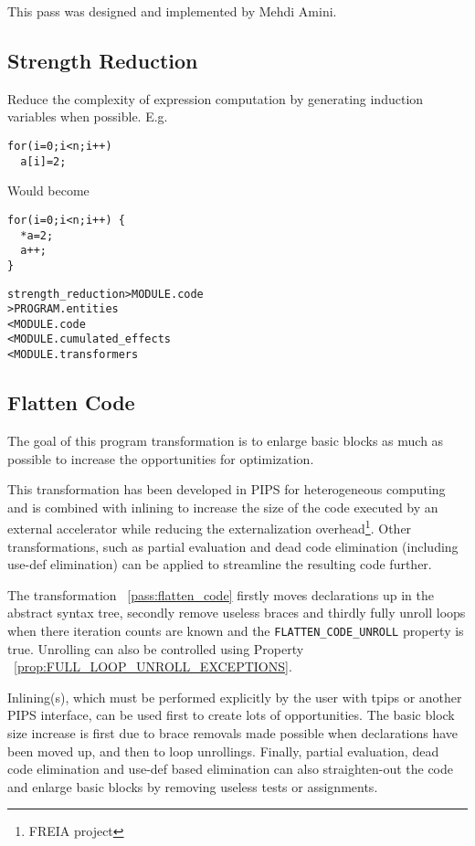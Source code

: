 \documentclass[a4paper]{report}
\newenvironment{PipsMake}{\begin{alltt}}{\end{alltt}}
\newcommand{\PipsPropRef}[1]{\texttt{\detokenize{#1}}~\ref{prop:#1}}
\newcommand{\PipsPassRef}[1]{\texttt{\detokenize{#1}}~\ref{pass:#1}}
\newenvironment{PipsPass}[1]{\label{pass:#1}}{}
\begin{document}
This pass was designed and implemented by Mehdi Amini.

\subsection{Strength Reduction}

\begin{PipsPass}{strength_reduction}
Reduce the complexity of expression computation by generating
induction variables when possible.
\end{PipsPass}
E.g.
\begin{lstlisting}
for(i=0;i<n;i++)
  a[i]=2;
\end{lstlisting}
Would become
\begin{lstlisting}
for(i=0;i<n;i++) {
  *a=2;
  a++;
}
\end{lstlisting}
\begin{PipsMake}
strength_reduction > MODULE.code
                   > PROGRAM.entities
    < MODULE.code
    < MODULE.cumulated_effects
    < MODULE.transformers
\end{PipsMake}


\subsection{Flatten Code}

\begin{PipsPass}{flatten_code}
The goal of this program transformation is to enlarge basic blocks as
much as possible to increase the opportunities for optimization.
\end{PipsPass}

This transformation has been developed in PIPS for heterogeneous computing
and is combined with inlining to increase the size of the code
executed by an external accelerator while reducing the
externalization overhead\footnote{FREIA project}. Other
transformations, such as partial evaluation and dead code elimination
(including use-def elimination) can be applied to streamline the
resulting code further.

The transformation \PipsPassRef{flatten_code} firstly moves declarations
up in the abstract syntax tree, secondly remove useless braces and thirdly
fully unroll loops when there iteration counts are known and the
\verb/FLATTEN_CODE_UNROLL/ property is true. Unrolling can also be
controlled using Property \PipsPropRef{FULL_LOOP_UNROLL_EXCEPTIONS}.

Inlining(s), which must be performed explicitly by the user with tpips
or another PIPS interface, can be used first to create lots of
opportunities. The basic block size increase is first due to brace
removals made possible when declarations have been moved up, and
then to loop unrollings. Finally, partial evaluation, dead code elimination
and use-def based elimination can also straighten-out the code and
enlarge basic blocks by removing useless tests or assignments.
\end{document}
